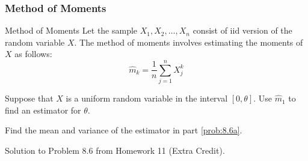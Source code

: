 		\subsubsection{Method of Moments} \label{subsubsec:Method of Moments}
                \begin{example}{Method of Moments}
                  Let the sample $X_{1}, X_{2}, \ldots, X_{n}$ consist of iid version of the random variable $X$. The method of moments involves estimating the moments of $X$ as follows:
                  \begin{equation*}
                    \hat{m}_{k} = \frac{1}{n} \sum\limits_{j=1}^{n} X_{j}^{k}
                  \end{equation*}
                  \begin{boldalphlist}
                  \item Suppose that $X$ is a uniform random variable in the interval $\left[ 0, \theta \right]$. Use $\hat{m}_{1}$ to find an estimator for $\theta$. \label{prob:8.6a}
                  \item Find the mean and variance of the estimator in part \ref{prob:8.6a}.
                  \end{boldalphlist}

                  \tcblower

                  Solution to Problem 8.6 from Homework 11 (Extra Credit).
                \end{example}
                		
